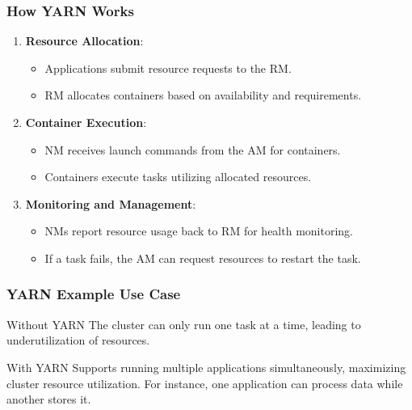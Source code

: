 \documentclass[aspectratio=169]{beamer}
\begin{document}
\begin{frame}[fragile]
    \frametitle{How YARN Works}
    \begin{enumerate}
        \item \textbf{Resource Allocation}:
        \begin{itemize}
            \item Applications submit resource requests to the RM.
            \item RM allocates containers based on availability and requirements.
        \end{itemize}

        \item \textbf{Container Execution}:
        \begin{itemize}
            \item NM receives launch commands from the AM for containers.
            \item Containers execute tasks utilizing allocated resources.
        \end{itemize}

        \item \textbf{Monitoring and Management}:
        \begin{itemize}
            \item NMs report resource usage back to RM for health monitoring.
            \item If a task fails, the AM can request resources to restart the task.
        \end{itemize}
    \end{enumerate}
\end{frame}

\begin{frame}[fragile]
    \frametitle{YARN Example Use Case}
    \begin{block}{Without YARN}
        The cluster can only run one task at a time, leading to underutilization of resources.
    \end{block}
    
    \begin{block}{With YARN}
        Supports running multiple applications simultaneously, maximizing cluster resource utilization.
        For instance, one application can process data while another stores it.
    \end{block}
\end{frame}
\end{document}
